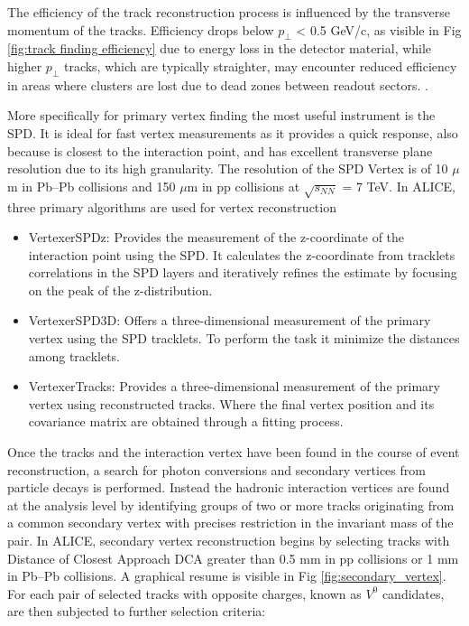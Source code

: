 \documentclass[12pt,a4paper]{book}
\begin{document}
	The efficiency of the track reconstruction process is influenced by the transverse momentum of the tracks. Efficiency drops below $p_\perp$ < 0.5 GeV/c, as visible in Fig \ref{fig:track finding efficiency} due to energy loss in the detector material, while higher $p_\perp$ tracks, which are typically straighter, may encounter reduced efficiency in areas where clusters are lost due to dead zones between	readout sectors. \cite{Padhan:2924203}.
	
	More specifically for primary vertex finding the most useful instrument is the SPD. It is ideal for fast vertex measurements  as it provides a quick response, also because is closest to the interaction point, and has excellent transverse plane resolution due to its high granularity. The resolution of the SPD Vertex is of 10 $\mu$m in Pb–Pb collisions and 150 $\mu$m in pp collisions at $\sqrt{s_{NN}}$ = 7 TeV. In ALICE, three primary algorithms are used for vertex reconstruction
	\begin{itemize}
		\item VertexerSPDz: Provides the measurement of the z-coordinate of the interaction	point using the SPD. It calculates the z-coordinate from tracklets correlations in the SPD layers and iteratively refines the estimate by focusing on the peak of the z-distribution.
		\item  VertexerSPD3D: Offers a three-dimensional measurement of the primary vertex using the SPD tracklets. To perform the task it minimize the distances among tracklets. 
		\item VertexerTracks: Provides a three-dimensional measurement of the primary vertex using reconstructed tracks. Where the final vertex position and its covariance matrix are obtained through a fitting process.
	\end{itemize}
	 \cite{Padhan:2924203}
	 Once the tracks and the interaction vertex have been found in the course of event
	 reconstruction, a search for photon conversions and secondary vertices from particle decays is performed. Instead the hadronic interaction vertices are found at the analysis level by identifying groups of two or more tracks originating from a common secondary vertex with precises restriction in the invariant mass of the pair. In ALICE, secondary vertex reconstruction begins by selecting tracks with Distance of Closest Approach DCA greater than 0.5 mm in pp collisions or 1 mm in Pb–Pb collisions. A graphical resume is visible in Fig \ref{fig:secondary_vertex}. For each pair of selected tracks with opposite charges, known as $V^0$ candidates, are then subjected to further selection criteria: 
\end{document}
